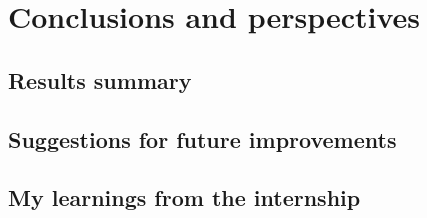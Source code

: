 \section{Conclusions and perspectives}
\subsection{Results summary}
\subsection{Suggestions for future improvements}
\subsection{My learnings from the internship}